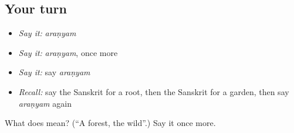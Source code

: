 \subsection*{Your turn}
\begin{itemize}
\raggedright
  \item \emph{Say it:} \emph{araṇyam}
  \item \emph{Say it:} \emph{araṇyam}, once more
  \item \emph{Say it:} say \emph{araṇyam}
  \item \emph{Recall:} say the Sanskrit for a root, then the Sanskrit for a garden, then say \emph{araṇyam} again
\end{itemize}

\begin{tcolorbox}[breakable,colback=teal!4,colframe=teal!35!black,title={Before you move on}]
What does  mean? (\textquotedblleft{}A forest, the wild\textquotedblright{}.) Say it once more.
\end{tcolorbox}
